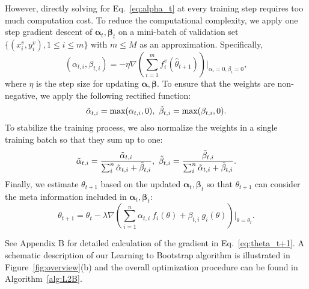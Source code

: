 \documentclass{article}
\begin{document}
However, directly solving for Eq.~\eqref{eq:alpha_t} at every training step requires too much computation cost. To reduce the computational complexity, we apply one step gradient descent of $\boldsymbol{\alpha}_t, \boldsymbol{\beta}_t$ on a mini-batch of validation set $\{(x_i^v,y_i^v),1\leq i \leq m\}$ with $m\leq M$ as an approximation. Specifically,
\begin{equation}\label{eq:alpha_beta}
(\alpha_{t,i},\beta_{t,i})= -\eta\nabla(\sum_{i=1}^m f_i^v(\hat{\theta}_{t+1}))\Big |_{\alpha_i=0,\beta_i=0},
\end{equation}
where $\eta$ is the step size for updating $\boldsymbol{\alpha},\boldsymbol{\beta}$. To ensure that the weights are non-negative, we apply the following rectified function:
\begin{equation}\label{eq:rectified_weights}
\Tilde{\alpha}_{t,i}=\text{max}(\alpha_{t,i},0),\ \Tilde{\beta}_{t,i}=\text{max}(\beta_{t,i},0).
\end{equation}
To stabilize the training process, we also normalize the weights in a single training batch so that they sum up to one: 
\begin{equation}\label{eq:alpha_norm}
\Tilde{\alpha}_{t,i}=\frac{\Tilde{\alpha}_{t,i}}{\sum_i^n \Tilde{\alpha}_{t,i}+\Tilde{\beta}_{t,i}},\ \Tilde{\beta}_{t,i}=\frac{\Tilde{\beta}_{t,i}}{\sum_i^n \Tilde{\alpha}_{t,i}+\Tilde{\beta}_{t,i}}.
\end{equation}
Finally, we estimate $\theta_{t+1}$ based on the updated $\boldsymbol{\alpha}_{t},\boldsymbol{\beta}_{t}$ so that $\theta_{t+1}$ can consider the meta information included in $\boldsymbol{\alpha}_{t},\boldsymbol{\beta}_{t}$:
\begin{equation}\label{eq:theta_t+1}
\theta_{t+1} = \theta_t - \lambda \nabla (\sum_{i=1}^n \alpha_{t,i} \ f_{i}(\theta)+\beta_{t,i}\ g_{i}(\theta))\Big |_{\theta=\theta_t}.
\end{equation}

See Appendix B for detailed calculation of the gradient in Eq.~\eqref{eq:theta_t+1}. 
A schematic description of our Learning to Bootstrap algorithm is illustrated in Figure~\ref{fig:overview}(b) and the overall optimization procedure can be found in Algorithm~\ref{alg:L2B}.
\end{document}
